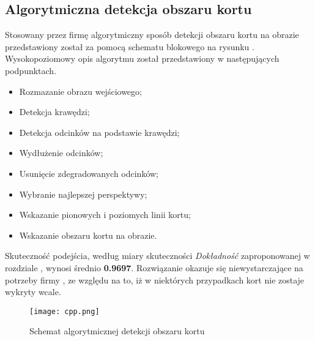 \subsection{Algorytmiczna detekcja obszaru kortu}

Stosowany przez firmę \blue{} algorytmiczny sposób detekcji obszaru kortu na obrazie przedstawiony został za pomocą schematu blokowego na rysunku . Wysokopoziomowy opis algorytmu został przedstawiony w następujących podpunktach.

\begin{itemize}
  \item Rozmazanie obrazu wejściowego;
  \item Detekcja krawędzi;
  \item Detekcja odcinków na podstawie krawędzi;
  \item Wydłużenie odcinków;
  \item Usunięcie zdegradowanych odcinków;
  \item Wybranie najlepszej perspektywy;
  \item Wskazanie pionowych i poziomych linii kortu;
  \item Wskazanie obszaru kortu na obrazie.
\end{itemize}

Skuteczność podejścia, według miary skuteczności \textit{Dokładność} zaproponowanej w rozdziale , wynosi średnio \textbf{0.9697}.
Rozwiązanie okazuje się niewystarczające na potrzeby firmy \blue{}, ze względu na to, iż w niektórych przypadkach kort nie zostaje wykryty wcale.

\begin{figure}[h]
  \centering
  \caption{Schemat algorytmicznej detekcji obszaru kortu}
  \texttt{[image: cpp.png]}
  \label{fig:algcpp}
\end{figure}
